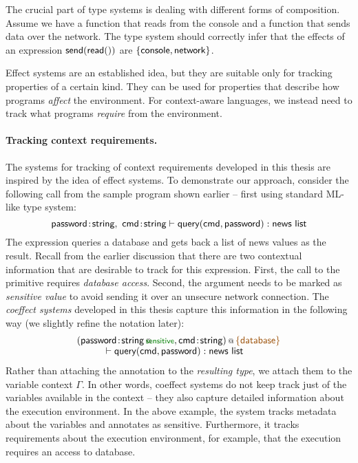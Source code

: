 The crucial part of type systems is dealing with different forms of composition. Assume
we have a function  that reads from the console and a function  that sends
data over the network. The type system should correctly infer that the effects of an
expression $\textnormal{\sffamily send}(\textnormal{\sffamily read}())$ are $\{ \textnormal{\sffamily console}, \textnormal{\sffamily network} \}$.

Effect systems are an established idea, but they are suitable only for tracking properties of a
certain kind. They can be used for properties that describe how programs \emph{affect} the environment.
For context-aware languages, we instead need to track what programs \emph{require} from the environment.

\paragraph{Tracking context requirements.}

The systems for tracking of context requirements developed in this thesis are inspired by the idea
of effect systems. To demonstrate our approach, consider the following call from the sample program
shown earlier -- first using standard ML-like type system:
%
\begin{equation*}
\textnormal{\sffamily password}\!:\!\textnormal{\sffamily string},~\textnormal{\sffamily cmd}\!:\!\textnormal{\sffamily string}
  \vdash \textnormal{\sffamily query}(\textnormal{\sffamily cmd}, \textnormal{\sffamily password}) : \textnormal{\sffamily news list}
\end{equation*}
%
The expression queries a database and gets back a list of news values as the result. Recall from the
earlier discussion that there are two contextual information that are desirable to track for this
expression. First, the call to the  primitive requires \emph{database access}. Second,
the  argument needs to be marked as \emph{sensitive value} to avoid sending it over
an unsecure network connection. The \emph{coeffect systems} developed in this thesis capture this
information in the following way (we slightly refine the notation later):
%
\begin{equation*}
\begin{array}{l}
 \coctx{( \ident{password}\!:\!\coctx{\ident{string}}{\hspace{-0.75em}\ident{\cclrd{\footnotesize sensitive}}},
   \ident{cmd}\!:\!\ident{string})}{ \aclrd{\{ \ident{database} \}}}  \\[-0.1em]
 \hspace{3em} \vdash\ident{query}(\ident{cmd}, \ident{password}) : \ident{news list}
\end{array}
\end{equation*}
%
Rather than attaching the annotation to the \emph{resulting type}, we attach them to the variable
context $\Gamma$. In other words, coeffect systems do not keep track just of the variables available
in the context -- they also capture detailed information about the execution environment.
In the above example, the system tracks metadata about the variables and annotates 
as sensitive. Furthermore, it tracks requirements about the execution environment, for example,
that the execution requires an access to database.

